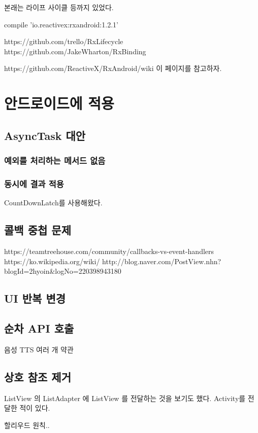 \documentclass{book}
\begin{document}
본래는 라이프 사이클 등까지 있었다.


compile 'io.reactivex:rxandroid:1.2.1' 



https://github.com/trello/RxLifecycle
https://github.com/JakeWharton/RxBinding

https://github.com/ReactiveX/RxAndroid/wiki 이 페이지를 참고하자.

\chapter{안드로이드에 적용}
\section{AsyncTask 대안}
\subsection{예외를 처리하는 메서드 없음}


\subsection{동시에 결과 적용}
CountDownLatch를 사용해왔다.

\section{콜백 중첩 문제}
https://teamtreehouse.com/community/callbacks-vs-event-handlers
https://ko.wikipedia.org/wiki/%
http://blog.naver.com/PostView.nhn?blogId=2hyoin&logNo=220398943180

\section{UI 반복 변경}

\section{순차 API 호출}
음성 TTS
여러 개 약관

\section{상호 참조 제거}
ListView 의 ListAdapter 에 ListView 를 전달하는 것을 보기도 했다.
Activity를 전달한 적이 있다.


할리우드 원칙..
\end{document}
